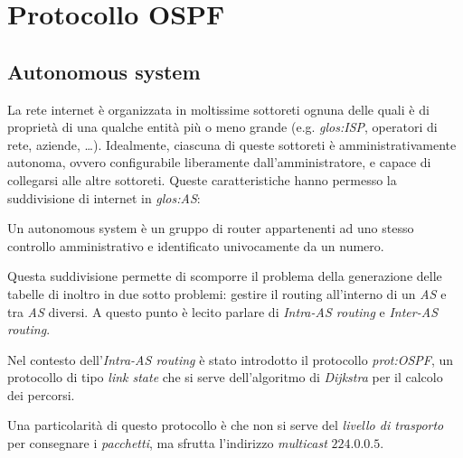 \section{Protocollo OSPF}
\subsection{Autonomous system}
La rete internet è organizzata in moltissime sottoreti ognuna delle quali è di
proprietà di una qualche entità più o meno grande (e.g. \emph{\gls{glos:ISP}},
operatori di rete, aziende, \dots). Idealmente, ciascuna di queste sottoreti è
amministrativamente autonoma, ovvero configurabile liberamente dall'amministratore,
e capace di collegarsi alle altre sottoreti.
Queste caratteristiche hanno permesso la suddivisione di internet in
\emph{\gls{glos:AS}}:
\begin{definition}
    Un autonomous system è un gruppo di router appartenenti ad uno stesso
    controllo amministrativo e identificato univocamente da un numero\footnotemark.
\end{definition}
\noindent
Questa suddivisione permette di scomporre il problema della generazione delle
tabelle di inoltro in due sotto problemi: gestire il routing all'interno di un
\emph{AS} e tra \emph{AS} diversi. A questo punto è lecito parlare di
\emph{Intra-AS routing} e \emph{Inter-AS routing}.

\bigskip\noindent
Nel contesto dell'\emph{Intra-AS routing} è stato introdotto il protocollo
\emph{\gls{prot:OSPF}}, un protocollo di tipo \emph{link state} che si serve
dell'algoritmo di \emph{Dijkstra} per il calcolo dei percorsi.

Una particolarità di questo protocollo è che non si serve del \emph{livello di
trasporto} per consegnare i \emph{pacchetti}, ma sfrutta l'indirizzo
\emph{multicast} $224.0.0.5$.

